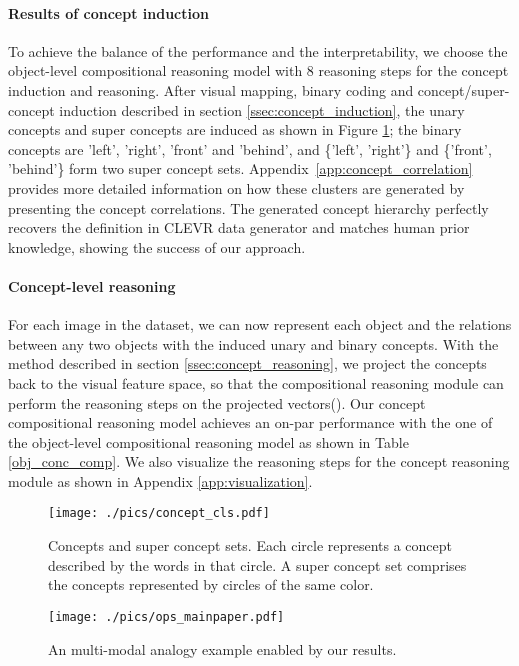 \documentclass[final]{cvpr}
\begin{document}
\paragraph{Results of concept induction}
To achieve the balance of the performance and the interpretability, we choose the object-level compositional reasoning model with 8 reasoning steps for the concept induction and reasoning. After visual mapping, binary coding and concept/super-concept induction described in section \ref{ssec:concept_induction}, the unary concepts and super concepts are induced as shown in Figure \ref{conc_cls}; the binary concepts are 'left', 'right', 'front' and 'behind', and \{'left', 'right'\} and \{'front', 'behind'\} form two super concept sets.
Appendix~\ref{app:concept_correlation} provides more detailed information on how these clusters are generated by presenting the concept correlations. 
The generated concept hierarchy perfectly recovers the definition in CLEVR data generator and matches human prior knowledge, showing the success of our approach.
\vspace{-3mm}
\paragraph{Concept-level reasoning}
For each image in the dataset, we can now represent each object and the relations between any two objects with the induced unary and binary concepts. With the method described in section \ref{ssec:concept_reasoning}, we project the concepts back to the visual feature space, so that the compositional reasoning module can perform the reasoning steps on the projected vectors(). Our concept compositional reasoning model achieves an on-par performance with the one of the object-level compositional reasoning model as shown in Table \ref{obj_conc_comp}. We also visualize the reasoning steps for the concept reasoning module as shown in Appendix \ref{app:visualization}.

\begin{figure}
\centering
\texttt{[image: ./pics/concept\_cls.pdf]}
\caption{Concepts and super concept sets. Each circle represents a concept described by the words in that circle. A super concept set comprises the concepts represented by circles of the same color.}
\label{conc_cls}
\vspace{-3mm}
\end{figure}



\begin{figure}[t]
\centering
\texttt{[image: ./pics/ops\_mainpaper.pdf]}
\caption{An multi-modal analogy example enabled by our results.}
\label{ops_main}
\vspace{-1mm}
\end{figure}
\end{document}
